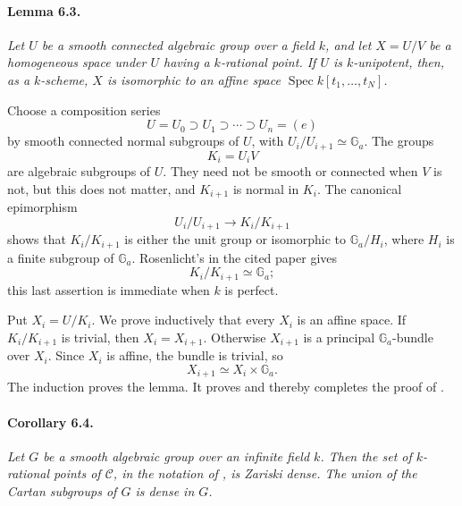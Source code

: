 \paragraph{\textbf{Lemma 6.3.}}
{\itshape Let \(U\) be a smooth connected algebraic group over a
field \(k\), and let \(X=U/V\) be a homogeneous space under \(U\)
having a \(k\)-rational point. If \(U\) is \(k\)-unipotent, then,
as a \(k\)-scheme, \(X\) is isomorphic to an affine space
\(\operatorname{Spec}k[t_1,\ldots,t_N]\).}

Choose a composition series
\[
  U=U_0\supset U_1\supset\cdots\supset U_n=(e)
\]
by smooth connected normal subgroups of \(U\), with
\(U_i/U_{i+1}\simeq\mathbb G_a\). The groups
\[
  K_i=U_iV
\]
are algebraic subgroups of \(U\). They need not be smooth or
connected when \(V\) is not, but this does not matter, and
\(K_{i+1}\) is normal in \(K_i\). The canonical epimorphism
\[
  U_i/U_{i+1}\longrightarrow K_i/K_{i+1}
\]
shows that \(K_i/K_{i+1}\) is either the unit group or isomorphic
to \(\mathbb G_a/H_i\), where \(H_i\) is a finite subgroup of
\(\mathbb G_a\). Rosenlicht's  in the cited paper gives
\[
  K_i/K_{i+1}\simeq\mathbb G_a;
\]
this last assertion is immediate when \(k\) is perfect.

Put \(X_i=U/K_i\). We prove inductively that every \(X_i\) is an
affine space. If \(K_i/K_{i+1}\) is trivial, then
\(X_i=X_{i+1}\). Otherwise \(X_{i+1}\) is a principal
\(\mathbb G_a\)-bundle over \(X_i\). Since \(X_i\) is affine,
the bundle is trivial, so
\[
  X_{i+1}\simeq X_i\times\mathbb G_a.
\]
The induction proves the lemma. It proves  and thereby
completes the proof of .



\paragraph{\textbf{Corollary 6.4.}}
{\itshape Let \(G\) be a smooth algebraic group over an infinite
field \(k\). Then the set of \(k\)-rational points of
\(\mathcal C\), in the notation of , is Zariski dense. The
union of the Cartan subgroups of \(G\) is dense in \(G\).}

